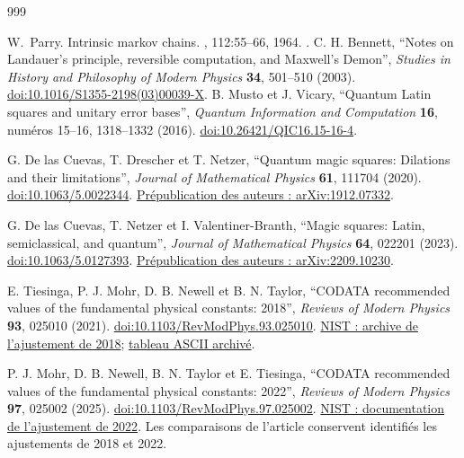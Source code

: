 \begin{thebibliography}{999}

W.~Parry.
\newblock Intrinsic markov chains.
, 112:55--66,
  1964.
\newblock \href {https://doi.org/10.1090/S0002-9947-1964-0161372-1}
  {}.
 C. H. Bennett, ``Notes on Landauer's principle,
reversible computation, and Maxwell's Demon'', \emph{Studies in History
and Philosophy of Modern Physics} \textbf{34}, 501--510 (2003).
\href{https://doi.org/10.1016/S1355-2198(03)00039-X}{doi:10.1016/S1355-2198(03)00039-X}.
B. Musto et J. Vicary,
``Quantum Latin squares and unitary error bases'',
\emph{Quantum Information and Computation} \textbf{16},
numéros 15--16, 1318--1332 (2016).
\href{https://doi.org/10.26421/QIC16.15-16-4}{doi:10.26421/QIC16.15-16-4}.

G. De las Cuevas, T. Drescher et T. Netzer,
``Quantum magic squares: Dilations and their limitations'',
\emph{Journal of Mathematical Physics} \textbf{61}, 111704 (2020).
\href{https://doi.org/10.1063/5.0022344}{doi:10.1063/5.0022344}.
\href{https://arxiv.org/abs/1912.07332}{Prépublication des auteurs : arXiv:1912.07332}.

G. De las Cuevas, T. Netzer et I. Valentiner-Branth,
``Magic squares: Latin, semiclassical, and quantum'',
\emph{Journal of Mathematical Physics} \textbf{64}, 022201 (2023).
\href{https://doi.org/10.1063/5.0127393}{doi:10.1063/5.0127393}.
\href{https://arxiv.org/abs/2209.10230}{Prépublication des auteurs : arXiv:2209.10230}.

E. Tiesinga, P. J. Mohr, D. B. Newell et B. N. Taylor,
``CODATA recommended values of the fundamental physical constants: 2018'',
\emph{Reviews of Modern Physics} \textbf{93}, 025010 (2021).
\href{https://doi.org/10.1103/RevModPhys.93.025010}{doi:10.1103/RevModPhys.93.025010}.
\href{https://physics.nist.gov/cuu/Constants/archive2018.html}{NIST : archive de l’ajustement de 2018};
\href{https://physics.nist.gov/cuu/Constants/ArchiveASCII/allascii_2018.txt}{tableau ASCII archivé}.

P. J. Mohr, D. B. Newell, B. N. Taylor et E. Tiesinga,
``CODATA recommended values of the fundamental physical constants: 2022'',
\emph{Reviews of Modern Physics} \textbf{97}, 025002 (2025).
\href{https://doi.org/10.1103/RevModPhys.97.025002}{doi:10.1103/RevModPhys.97.025002}.
\href{https://physics.nist.gov/cuu/Constants/article2022.html}{NIST : documentation de l’ajustement de 2022}.
Les comparaisons de l’article conservent identifiés les ajustements de 2018 et 2022.


\end{thebibliography}

